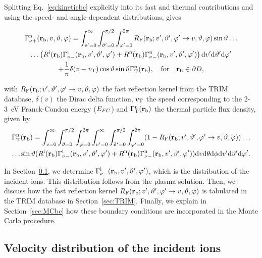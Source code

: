 Splitting Eq.~\eqref{eq:kineticbc} explicitly into its fast and thermal contributions and using the speed- and angle-dependent distributions, gives

\begin{multline}
\Gamma_{\nu +}^{\mathrm{n}}({\bf r}_{\mathrm{b}},v,\vartheta,\varphi) = \int_{v'=0}^{\infty} \int_{\vartheta' = 0}^{\pi/2} \int_{\varphi' = 0}^{2\pi} R_{\mathrm{F}}({\bf r}_{\mathrm{b}};v',\vartheta',\varphi' \rightarrow v,\vartheta,\varphi) \sin \vartheta \ldots \\
\ldots \left( R^{\mathrm{i}}({\bf r}_{\mathrm{b}}) \Gamma_{\nu -}^{\mathrm{i}}({\bf r}_{\mathrm{b}},v',\vartheta',\varphi') + R^{\mathrm{n}}({\bf r}_{\mathrm{b}}) \Gamma_{\nu -}^{\mathrm{n}}({\bf r}_{\mathrm{b}},v',\vartheta',\varphi') \right) \mathrm{d} v' \mathrm{d} \vartheta' \mathrm{d} \varphi' \\
+ \frac{1}{\pi} \delta(v-v_{\mathrm{T}}) \cos \vartheta \sin \vartheta \Gamma_{\mathrm{T}}^{\mathrm{n}}({\bf r}_{\mathrm{b}}), \quad \text{for} \quad {\bf r}_{\mathrm{b}} \in \partial D, \label{eq:kineticbc2}
\end{multline}

\noindent with $R_{\mathrm{F}}({\bf r}_{\mathrm{b}};v',\vartheta',\varphi' \rightarrow v, \vartheta, \varphi)$ the fast reflection kernel from the TRIM database, $\delta(v)$ the Dirac delta function, $v_{\mathrm{T}}$ the speed corresponding to the 2-3~eV Franck-Condon energy ($E_{FC}$) and $\Gamma_{\mathrm{T}}^{\mathrm{n}}({\bf r}_{\mathrm{b}})$ the thermal particle flux density, given by
\begin{multline}
\Gamma_{\mathrm{T}}^{\mathrm{n}}({\bf r}_{\mathrm{b}}) = \int_{v=0}^{\infty} \int_{\vartheta = 0}^{\pi/2} \int_{\varphi = 0}^{2\pi} \int_{v'=0}^{\infty} \int_{\vartheta' = 0}^{\pi/2} \int_{\varphi' = 0}^{2\pi} (1 - R_{\mathrm{F}}({\bf r}_{\mathrm{b}};v',\vartheta',\varphi' \rightarrow v, \vartheta,\varphi)) \ldots\\
\ldots \sin \vartheta (R^{\mathrm{i}}({\bf r}_{\mathrm{b}}) \Gamma_{\nu -}^{\mathrm{i}}({\bf r}_{\mathrm{b}},v',\vartheta',\varphi') + R^{\mathrm{n}}({\bf r}_{\mathrm{b}}) \Gamma_{\nu -}^{\mathrm{n}}({\bf r}_{\mathrm{b}},v',\vartheta',\varphi')) \mathrm{d} v \mathrm{d} \theta \mathrm{d} \phi \mathrm{d} v' \mathrm{d} \vartheta' \mathrm{d} \varphi'. \label{eq:Gammant}
\end{multline}

In Section~\ref{sec:fion}, we determine $\Gamma_{\nu -}^{\mathrm{i}}({\bf r}_{\mathrm{b}},v',\vartheta',\varphi')$, which is the distribution of the incident ions. This distribution follows from the plasma solution. Then, we discuss how the fast reflection kernel $R_{\mathrm{F}}({\bf r}_{\mathrm{b}};v',\vartheta',\varphi' \rightarrow v,\vartheta,\varphi)$ is tabulated in the TRIM database in Section~\ref{sec:TRIM}. Finally, we explain in Section~\ref{sec:MCbc} how these boundary conditions are incorporated in the Monte Carlo procedure.

\subsection{Velocity distribution of the incident ions}\label{sec:fion}

